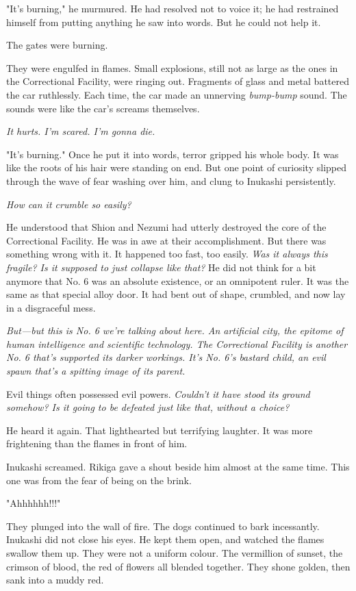 "It's burning," he murmured. He had resolved not to voice it; he had
restrained himself from putting anything he saw into words. But he could
not help it.

The gates were burning.

They were engulfed in flames. Small explosions, still not as large as
the ones in the Correctional Facility, were ringing out. Fragments of
glass and metal battered the car ruthlessly. Each time, the car made an
unnerving \emph{bump-bump} sound. The sounds were like the car's screams
themselves.

\emph{It hurts. I'm scared. I'm gonna die.}

"It's burning." Once he put it into words, terror gripped his whole
body. It was like the roots of his hair were standing on end. But one
point of curiosity slipped through the wave of fear washing over him,
and clung to Inukashi persistently.

\emph{How can it crumble so easily?}

He understood that Shion and Nezumi had utterly destroyed the core of
the Correctional Facility. He was in awe at their accomplishment. But
there was something wrong with it. It happened too fast, too easily. \emph{Was
it always this fragile? Is it supposed to just collapse like that?} He
did not think for a bit anymore that No. 6 was an absolute existence, or
an omnipotent ruler. It was the same as that special alloy door. It had
bent out of shape, crumbled, and now lay in a disgraceful mess.

\emph{But---but this is No. 6 we're talking about here. An artificial city, the
epitome of human intelligence and scientific technology. The
Correctional Facility is another No. 6 that's supported its darker
workings. It's No. 6's bastard child, an evil spawn that's a spitting
image of its parent.}

Evil things often possessed evil powers. \emph{Couldn't it have stood its
ground somehow? Is it going to be defeated just like that, without a
choice?}


He heard it again. That lighthearted but terrifying laughter. It was
more frightening than the flames in front of him.

Inukashi screamed. Rikiga gave a shout beside him almost at the same
time. This one was from the fear of being on the brink.

"Ahhhhhh!!!"

They plunged into the wall of fire. The dogs continued to bark
incessantly. Inukashi did not close his eyes. He kept them open, and
watched the flames swallow them up. They were not a uniform colour. The
vermillion of sunset, the crimson of blood, the red of flowers all
blended together. They shone golden, then sank into a muddy red.

